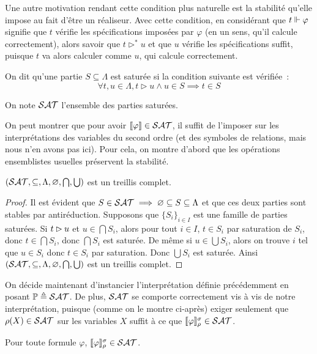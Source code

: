 \documentclass{article}
\begin{document}
Une autre motivation rendant cette condition plus naturelle est la stabilité qu'elle impose au fait d'être un réaliseur. Avec cette condition, en considérant que $t \Vdash \varphi$ signifie que $t$ vérifie les spécifications imposées par $\varphi$ (en un sens, qu'il calcule correctement), alors savoir que $t \rhd^* u$ et que $u$ vérifie les spécifications suffit, puisque $t$ va alors calculer comme $u$, qui calcule correctement.

\begin{defi}
    On dit qu'une partie $S\subseteq \Lambda$ est saturée si la condition suivante est vérifiée~:
    \[\forall t,u\in \Lambda, t \rhd u \land u \in S \implies t \in S\]

    On note $\mathcal {SAT}$ l'ensemble des parties saturées.
\end{defi}

On peut montrer que pour avoir $\llbracket \varphi \rrbracket \in \mathcal {SAT}$, il suffit de l'imposer sur les interprétations des variables du second ordre (et des symboles de relations, mais nous n'en avons pas ici). Pour cela, on montre d'abord que les opérations ensemblistes usuelles préservent la stabilité.

\begin{lem}
  $(\mathcal {SAT},\subseteq,\Lambda,\varnothing,\bigcap,\bigcup)$ est un treillis complet.
\end{lem}

\begin{proof}
  Il est évident que $S\in \mathcal {SAT} \implies \varnothing\subseteq S \subseteq \Lambda$ et que ces deux parties sont stables par antiréduction. Supposons que $\{S_i\}_{i\in I}$ est une famille de parties saturées. Si $t\rhd u$ et $u \in \bigcap S_i$, alors pour tout $i \in I$, $t \in S_i$ par saturation de $S_i$, donc $t\in \bigcap S_i$, donc $\bigcap S_i$ est saturée. De même si $u \in \bigcup S_i$, alors on trouve $i$ tel que $u \in S_i$ donc $t\in S_i$ par saturation. Donc $\bigcup S_i$ est saturée. Ainsi $(\mathcal {SAT},\subseteq,\Lambda,\varnothing, \bigcap,\bigcup)$ est un treillis complet.
\end{proof}

On décide maintenant d'instancier l'interprétation définie précédemment en posant $\mathbb{P} \triangleq \mathcal {SAT}$. De plus, $\mathcal {SAT}$ se comporte correctement vis à vis de notre interprétation, puisque (comme on le montre ci-après) exiger seulement que $\rho(X) \in \mathcal {SAT}$ sur les variables $X$ suffit à ce que $\llbracket \varphi \rrbracket_\rho^\sigma \in \mathcal {SAT}$.

\begin{lem}[Saturation]
  Pour toute formule $\varphi$, $\llbracket \varphi \rrbracket_\rho^\sigma\in \mathcal {SAT}$.
\end{lem}
\end{document}
